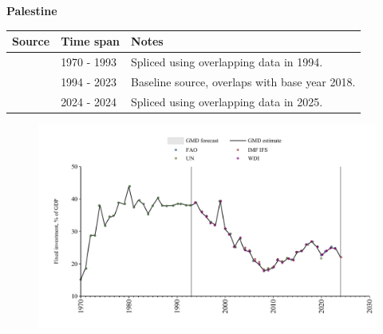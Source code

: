 \documentclass[12pt,a4paper,landscape]{article}
\begin{document}
\begin{adjustbox}{max totalsize={\paperwidth}{\paperheight},center}
\begin{minipage}[t][\textheight][t]{\textwidth}
\vspace*{0.5cm}
{}
\begin{center}
{\Large\bfseries Palestine}
\end{center}
\vspace{0.5cm}
\begin{table}[H]
\centering
\small
\begin{tabular}{|l|l|l|}
\hline
\textbf{Source} & \textbf{Time span} & \textbf{Notes} \\
\hline
\rowcolor{white}\cite{UN}& 1970 - 1993 &Spliced using overlapping data in 1994.\\
\rowcolor{lightgray}\cite{WDI}& 1994 - 2023 &Baseline source, overlaps with base year 2018.\\
\rowcolor{white}\cite{IMF_IFS}& 2024 - 2024 &Spliced using overlapping data in 2025.\\
\hline
\end{tabular}
\end{table}
\begin{figure}[H]
\centering
\includegraphics[width=\textwidth,height=0.6\textheight,keepaspectratio]{graphs/PSE_finv_GDP.pdf}
\end{figure}
\end{minipage}
\end{adjustbox}
\end{document}
